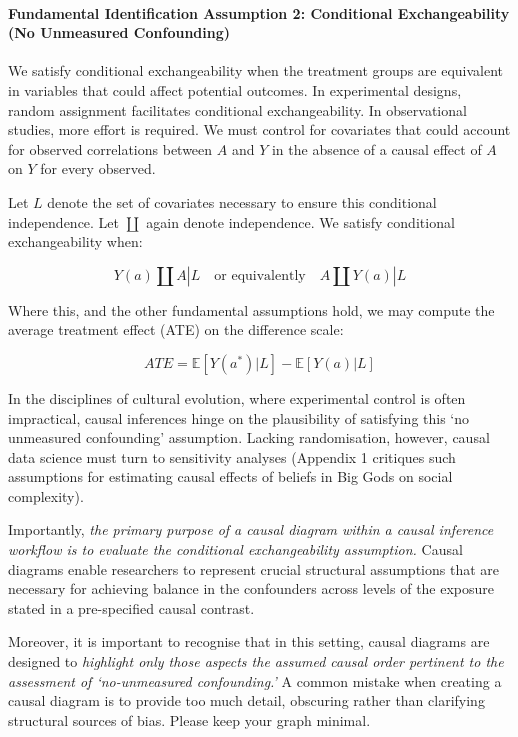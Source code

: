 \documentclass[
  singlecolumn,
  9pt]{article}
\let\oldparagraph\paragraph
\renewcommand{\paragraph}[1]{\oldparagraph{#1}\mbox{}}
\begin{document}
\paragraph{Fundamental Identification Assumption 2: Conditional
Exchangeability (No Unmeasured
Confounding)}\label{fundamental-identification-assumption-2-conditional-exchangeability-no-unmeasured-confounding}

We satisfy conditional exchangeability when the treatment groups are
equivalent in variables that could affect potential outcomes. In
experimental designs, random assignment facilitates conditional
exchangeability. In observational studies, more effort is required. We
must control for covariates that could account for observed correlations
between \(A\) and \(Y\) in the absence of a causal effect of \(A\) on
\(Y\) for every observed.

Let \(L\) denote the set of covariates necessary to ensure this
conditional independence. Let \(\coprod\) again denote independence. We
satisfy conditional exchangeability when:

\[
Y(a) \coprod A | L \quad \text{or equivalently} \quad A \coprod Y(a) | L
\]

Where this, and the other fundamental assumptions hold, we may compute
the average treatment effect (ATE) on the difference scale:

\[
ATE = \mathbb{E}[Y(a^*) | L] - \mathbb{E}[Y(a) | L]
\]

In the disciplines of cultural evolution, where experimental control is
often impractical, causal inferences hinge on the plausibility of
satisfying this `no unmeasured confounding' assumption. Lacking
randomisation, however, causal data science must turn to sensitivity
analyses (Appendix 1 critiques such assumptions for estimating causal
effects of beliefs in Big Gods on social complexity).

Importantly, \emph{the primary purpose of a causal diagram within a
causal inference workflow is to evaluate the conditional exchangeability
assumption.} Causal diagrams enable researchers to represent crucial
structural assumptions that are necessary for achieving balance in the
confounders across levels of the exposure stated in a pre-specified
causal contrast.

Moreover, it is important to recognise that in this setting, causal
diagrams are designed to \emph{highlight only those aspects the assumed
causal order pertinent to the assessment of `no-unmeasured
confounding.'} A common mistake when creating a causal diagram is to
provide too much detail, obscuring rather than clarifying structural
sources of bias. Please keep your graph minimal.
\end{document}
